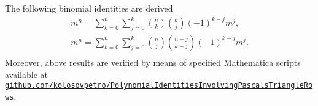 The following binomial identities are derived
\begin{gather*}
    m^n = \sum_{k=0}^{n} \sum_{j=0}^{k} \binom{n}{k} \binom{k}{j} (-1)^{k-j} m^j,\\
    m^n = \sum_{k=0}^{n} \sum_{j=0}^{k} \binom{n}{j} \binom{n-j}{k-j} (-1)^{k-j} m^j.\\
\end{gather*}
Moreover, above results are verified by means of specified Mathematica scripts available at
\href{https://github.com/kolosovpetro/PolynomialIdentitiesInvolvingPascalsTriangleRows/blob/develop/mathematica/PolynomialIdentitiesInvolvingPascalsTriangleRows.m}
{\texttt{github.com/kolosovpetro/PolynomialIdentitiesInvolvingPascalsTriangleRows}}.
